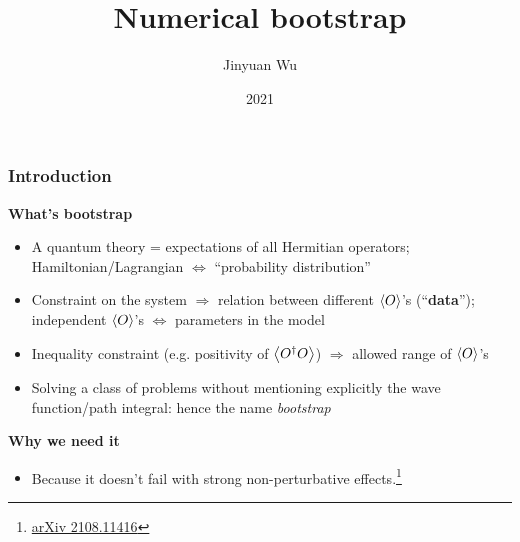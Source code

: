 \documentclass{beamer}
\title{Numerical bootstrap}
\author{Jinyuan Wu}
\institute{Department of Physics, Fudan University}
\date{2021}
\newcommand{\concept}[1]{\textbf{#1}}
\begin{document}
\frame{\titlepage}

\begin{frame}
\frametitle{Introduction}

\textbf{What's bootstrap}

\begin{itemize}
    \item A quantum theory = expectations of all Hermitian operators; 
    Hamiltonian/Lagrangian $\Leftrightarrow$ ``probability distribution''
    \item Constraint on the system $\Rightarrow$ relation between different $\expval{O}$'s (``\concept{data}'');
    independent $\expval{O}$'s $\Leftrightarrow$ parameters in the model
    \item Inequality constraint (e.g. positivity of $\expval{O^\dagger O}$) $\Rightarrow$ allowed 
    range of $\expval{O}$'s
    \item Solving a class of problems without mentioning explicitly the wave function/path integral: 
    hence the name \emph{bootstrap}
\end{itemize}

\vspace{1em}

\textbf{Why we need it}

\begin{itemize}
    \item Because it doesn't fail with strong non-perturbative effects.\footnote{\href{https://arxiv.org/abs/2108.11416}{arXiv 2108.11416}}
\end{itemize}

\end{frame}
\end{document}
